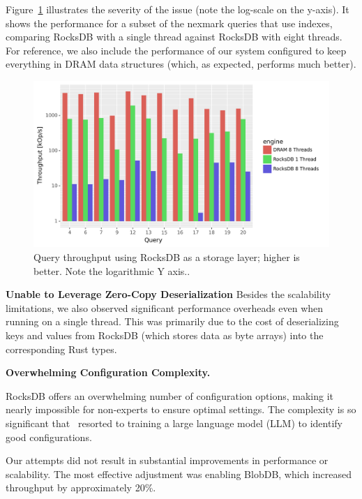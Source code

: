 Figure~\ref{fig:rocksdb} illustrates the severity of the issue (note
the log-scale on the y-axis). It shows the performance for a subset of
the nexmark queries that use indexes, comparing RocksDB with a single
thread against RocksDB with eight threads. For reference, we also
include the performance of our system configured to keep everything in
DRAM data structures (which, as expected, performs much better).

\begin{figure}[h]
  \begin{center}
  \includegraphics[scale=.43]{graph/rocksdb}
  \caption{Query throughput using RocksDB as a storage layer; higher
    is better.  Note the logarithmic Y axis.\label{fig:rocksdb}.}
  \end{center}
\end{figure}

\textbf{Unable to Leverage Zero-Copy Deserialization} Besides the
scalability limitations, we also observed significant performance
overheads even when running on a single thread. This was primarily due
to the cost of deserializing keys and values from RocksDB (which
stores data as byte arrays) into the corresponding Rust types.

\textbf{Overwhelming Configuration Complexity.}

RocksDB offers an overwhelming number of configuration options, making
it nearly impossible for non-experts to ensure optimal settings. The
complexity is so significant that~\cite{thakkar-hotstorage24} resorted
to training a large language model (LLM) to identify good
configurations.

Our attempts did not result in substantial improvements in performance
or scalability. The most effective adjustment was enabling BlobDB,
which increased throughput by approximately 20\%.

